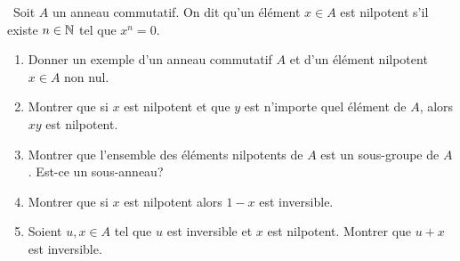 \begin{td-exo}[Nilpotents]\, %
    Soit \(A\) un anneau commutatif. On dit qu'un élément
    \(x\in A\) est nilpotent s'il existe \(n\in\mathbb{N}\) tel que
    \(x^n = 0\).
    \begin{enumerate}
        \item Donner un exemple d'un anneau commutatif \(A\)
        et d'un élément nilpotent \(x\in A\) non nul.

        \item Montrer que si \(x\) est nilpotent et que \(y\)
        est n'importe quel élément de \(A\), alors \(xy\) est nilpotent.

        \item Montrer que l'ensemble des éléments nilpotents de \(A\)
        est un sous-groupe de \(A\). Est-ce un sous-anneau?

        \item Montrer que si \(x\) est nilpotent alors \(1-x\)
        est inversible.

        \item Soient \(u,x\in A\) tel que \(u\) est inversible et
        \(x\) est nilpotent. Montrer que \(u+x\) est inversible.
    \end{enumerate}
\end{td-exo}

